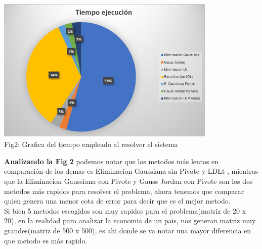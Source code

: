 \documentclass[10pt,a4paper]{article}
\begin{document}
\begin{center}
	\centering
	\includegraphics[width=10.5cm,height=7cm]{TiempoEjecucion.PNG}
	\\
	Fig2: Grafica del tiempo empleado al resolver el sistema
	 
\end{center}

\begin{multicols}{2}
\noindent \textbf{Analizando la Fig 2} podemos notar que los metodos más lentos en comparación de los demas es Eliminacion Gaussiana sin Pivote y LDLt , mientras que la Eliminacion Gaussiana con Pivote y Gauss Jordan con Pivote son los dos metodos más rapidos para resolver el problema, ahora tenemos que comparar quien genera una menor cota de error para decir que es el mejor metodo.\\
\noindent Si bien 5 metodos escogidos son muy rapidos para el problema(matriz de 20 x 20), en la realidad para analizar la economia de un pais, nos generan matriz muy grandes(matriz de 500 x 500), es ahi donde se va notar una mayor diferencia en que metodo es más rapido.
\end{multicols}
\end{document}
